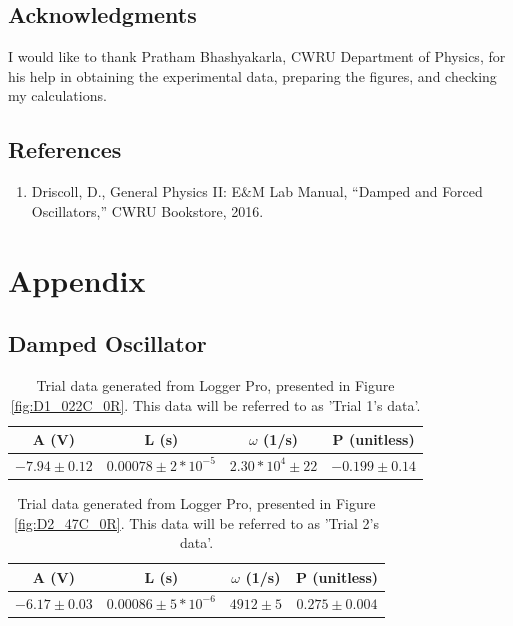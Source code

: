 \documentclass[12pt]{article}
\begin{document}
\subsection{Acknowledgments}
I would like to thank Pratham Bhashyakarla, CWRU Department of Physics, for his help in obtaining the experimental data, preparing the figures, and checking my calculations.

\subsection{References}
\begin{enumerate}
    \item Driscoll, D., General Physics II: E$\&$M Lab Manual, “Damped and Forced Oscillators,” CWRU Bookstore, 2016.
    \label{ref:MANUEL}
\end{enumerate}

\clearpage
\appendix
\section{Appendix}
\subsection{Damped Oscillator}

\begin{table}[h]
\centering
\begin{tabular}{|c|c|c|c|}
\hline
\textbf{A (V)} & \textbf{L (s)} & $\omega$ \textbf{(1/s)} & \textbf{P (unitless)} \\
\hline
$-7.94 \pm 0.12$  & $0.00078 \pm 2*10^{-5}$  & $2.30*10^4 \pm 22$ & $-0.199 \pm 0.14$ \\
\hline
\end{tabular}
\caption{Trial data generated from Logger Pro, presented in Figure \ref{fig:D1_022C_0R}. This data will be referred to as 'Trial 1's data'.}
\label{tab:damped_trial_1}
\end{table}

\begin{table}[h]
\centering
\begin{tabular}{|c|c|c|c|}
\hline
\textbf{A (V)} & \textbf{L (s)} & $\omega$ \textbf{(1/s)} & \textbf{P (unitless)} \\
\hline
$-6.17 \pm 0.03$  & $0.00086 \pm 5*10^{-6}$  & $4912 \pm 5$ & $0.275 \pm 0.004$ \\
\hline
\end{tabular}
\caption{Trial data generated from Logger Pro, presented in Figure \ref{fig:D2_47C_0R}. This data will be referred to as 'Trial 2's data'.}
\label{tab:damped_trial_2}
\end{table}
\end{document}
